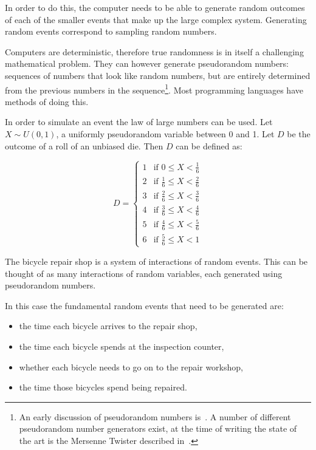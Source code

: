 In order to do this, the computer needs to be able to generate random outcomes
of each of the smaller events that make up the large complex system. Generating
random events correspond to sampling random numbers.

Computers are deterministic, therefore true randomness is in itself a
challenging mathematical problem.
They can however generate pseudorandom numbers: sequences of
numbers that look like random numbers, but are entirely determined from the
previous numbers in the sequence\footnote{An early
discussion of pseudorandom numbers is~\cite{von195113}. A number of different
pseudorandom number generators exist, at the time of writing the state of the
art is the Mersenne Twister described
in~\cite{matsumoto1998mersenne}.}.
Most programming languages have methods of doing this.

In order to simulate an event the law of large numbers can be used.
Let \(X \sim U(0, 1)\), a uniformly pseudorandom variable between 0 and 1.
Let \(D\) be the outcome of a roll of an unbiased die. Then \(D\) can be defined
as:

\begin{equation}
D =
  \begin{cases}
    1 & \text{if } 0 \leq X < \frac{1}{6}\\
    2 & \text{if } \frac{1}{6} \leq X < \frac{2}{6}\\
    3 & \text{if } \frac{2}{6} \leq X < \frac{3}{6}\\
    4 & \text{if } \frac{3}{6} \leq X < \frac{4}{6}\\
    5 & \text{if } \frac{4}{6} \leq X < \frac{5}{6}\\
    6 & \text{if } \frac{5}{6} \leq X < 1
  \end{cases}
\end{equation}

The bicycle repair shop is a system of interactions of
random events. This can be thought of as many interactions of random
variables, each generated using pseudorandom numbers.

In this case the fundamental random events that need to be generated are:

\begin{itemize}
  \item the time each bicycle arrives to the repair shop,
  \item the time each bicycle spends at the inspection counter,
  \item whether each bicycle needs to go on to the repair workshop,
  \item the time those bicycles spend being repaired.
\end{itemize}

